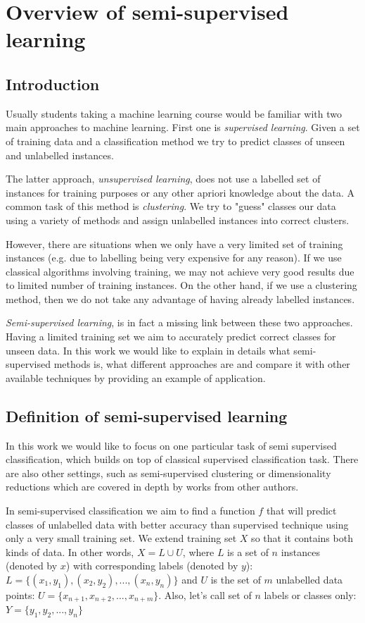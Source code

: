\documentclass[12pt, a4paper, pdflatex]{report}
\begin{document}
\newpage
\tableofcontents
\newpage

\chapter{Overview of semi-supervised learning}
\section{Introduction}
Usually students taking a machine learning course would be familiar with two main approaches to machine learning. First one is \textit{supervised learning}. Given a set of training data and a classification method we try to predict classes of unseen and unlabelled instances. 

The latter approach, \textit{unsupervised learning}, does not use a labelled set of instances for training purposes or any other apriori knowledge about the data. A common task of this method is \textit{clustering}. We try to "guess" classes our data using a variety of methods and assign unlabelled instances into correct clusters.

However, there are situations when we only have a very limited set of training instances (e.g. due to labelling being very expensive for any reason). If we use classical algorithms involving training, we may not achieve very good results due to limited number of training instances. On the other hand, if we use a clustering method, then we do not take any advantage of having already labelled instances.

\textit{Semi-supervised learning}, is in fact a missing link between these two approaches. Having a limited training set we aim to accurately predict correct classes for unseen data. In this work we would like to explain in details what semi-supervised methods is, what different approaches are and compare it with other available techniques by providing an example of application.

\section{Definition of semi-supervised learning}
In this work we would like to focus on one particular task of semi supervised classification, which builds on top of classical supervised classification task. There are also other settings, such as semi-supervised clustering or dimensionality reductions which are covered in depth by works from other authors.

In semi-supervised classification we aim to find a function $ f $ that will predict classes of unlabelled data with better accuracy than supervised technique using only a very small training set. We extend training set $ X $ so that it contains both kinds of data. In other words, $ X = L \cup U $, where $ L $ is a set of $ n $ instances (denoted by $ x $) with corresponding labels (denoted by $ y $): $ L = \{ (x_1, y_1), (x_2, y_2), ..., (x_n, y_n)\} $ and $ U $ is the set of $ m $ unlabelled data points: $ U = \{ x_{n+1}, x_{n+2}, ..., x_{n+m}\} $. Also, let's call set of $n$ labels or classes only: $ Y = \{ y_1, y_2, ..., y_n \} $
\end{document}
